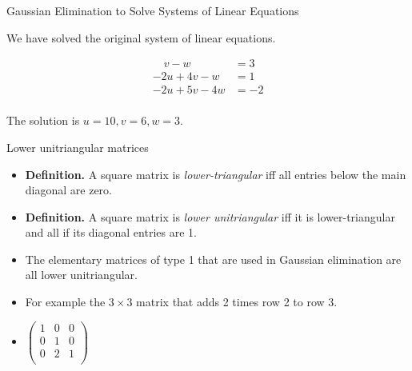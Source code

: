 \documentclass{beamer}
\begin{document}

\begin{frame}{Gaussian Elimination to Solve Systems of Linear Equations}

We have solved the original system of linear equations.

\pause

\begin{align*}
 \quad v - w         &= 3 \\
-2u + 4v - w         &= 1 \\
-2u + 5v - 4w        &= -2 \\
\end{align*}

\pause

The solution is $u = 10, v=6, w=3$.

\end{frame}


\begin{frame}{Lower unitriangular matrices}

\begin{itemize}

\item \textbf{Definition.} A square matrix is \emph{lower-triangular}
iff all entries below the main diagonal are zero.

\item \textbf{Definition.} A square matrix is \emph{lower unitriangular}
iff it is lower-triangular and all if its diagonal entries are 1.

\item The elementary matrices of type 1 that are used in Gaussian elimination
are all lower unitriangular.

\item For example the $3\times 3$ matrix that adds 2 times row 2 to row 3.

\item
$
\begin{pmatrix}
1 & 0 & 0 \\
0 & 1 & 0 \\
0 & 2 & 1 \\
\end{pmatrix}
$

\end{itemize}

\end{frame}
\end{document}
